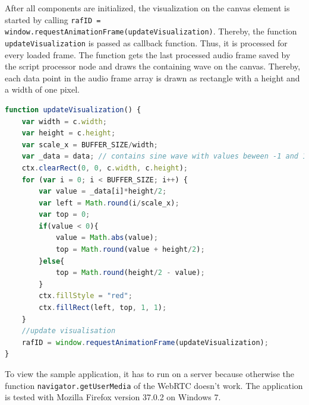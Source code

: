 After all components are initialized, the visualization on the canvas element is started by calling \lstinline{rafID = window.requestAnimationFrame(updateVisualization)}. Thereby, the function \lstinline{updateVisualization} is passed as callback function. Thus, it is processed for every loaded frame. The function gets the last processed audio frame saved by the script processor node and draws the containing wave on the canvas. Thereby, each data point in the audio frame array is drawn as rectangle with a height and a width of one pixel. 

\begin{lstlisting}[caption={Web Audio Demo: Update visualization.},label={lst:demo4}, language=JavaScript]
function updateVisualization() {
    var width = c.width;
    var height = c.height;
    var scale_x = BUFFER_SIZE/width;
    var _data = data; // contains sine wave with values beween -1 and 1
    ctx.clearRect(0, 0, c.width, c.height);
    for (var i = 0; i < BUFFER_SIZE; i++) {
        var value = _data[i]*height/2;
        var left = Math.round(i/scale_x);
        var top = 0;
        if(value < 0){
            value = Math.abs(value);
            top = Math.round(value + height/2);
        }else{
            top = Math.round(height/2 - value);
        }
        ctx.fillStyle = "red";
        ctx.fillRect(left, top, 1, 1);
    }
    //update visualisation
    rafID = window.requestAnimationFrame(updateVisualization);
}
\end{lstlisting}


To view the sample application, it has to run on a server because otherwise the function \lstinline{navigator.getUserMedia} of the WebRTC doesn’t work. The application is tested with Mozilla Firefox version 37.0.2 on Windows 7.
